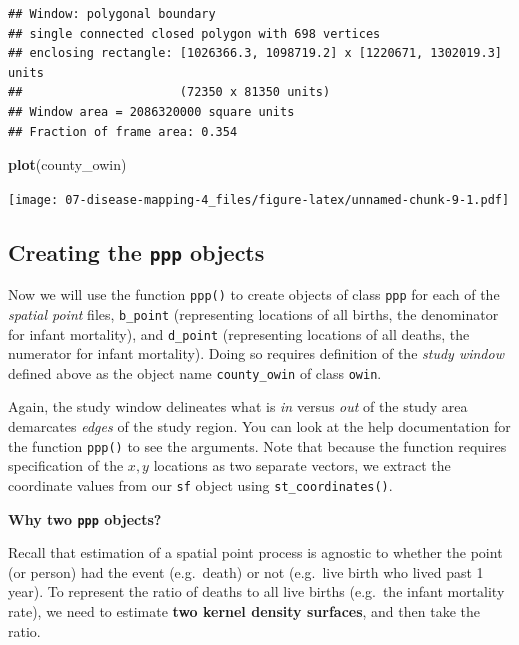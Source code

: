 \documentclass[
]{book}
\newenvironment{Shaded}{\begin{snugshade}}{\end{snugshade}}
\newcommand{\FunctionTok}[1]{\textcolor[rgb]{0.13,0.29,0.53}{\textbf{#1}}}
\newcommand{\NormalTok}[1]{#1}
\newenvironment{rmdnote}[1]
  {
  \begin{itemize}
  \renewcommand{\labelitemi}{
    \raisebox{-.7\height}[0pt][0pt]{
      {\setkeys{Gin}{width=3em,keepaspectratio}\texttt{[image: images/\#1]}}
    }
  }
  \setlength{\fboxsep}{1em}
  \begin{note}
  \item
  }
  {
  \end{note}
  \end{itemize}
  }
\begin{document}
\begin{verbatim}
## Window: polygonal boundary
## single connected closed polygon with 698 vertices
## enclosing rectangle: [1026366.3, 1098719.2] x [1220671, 1302019.3] units
##                      (72350 x 81350 units)
## Window area = 2086320000 square units
## Fraction of frame area: 0.354
\end{verbatim}

\begin{Shaded}
\begin{Highlighting}[]
\FunctionTok{plot}\NormalTok{(county\_owin)}
\end{Highlighting}
\end{Shaded}

\texttt{[image: 07-disease-mapping-4\_files/figure-latex/unnamed-chunk-9-1.pdf]}

\hypertarget{creating-the-ppp-objects}{%
\subsection{\texorpdfstring{Creating the \texttt{ppp} objects}{Creating the ppp objects}}\label{creating-the-ppp-objects}}

Now we will use the function \texttt{ppp()} to create objects of class \texttt{ppp} for each of the \emph{spatial point} files, \texttt{b\_point} (representing locations of all births, the denominator for infant mortality), and \texttt{d\_point} (representing locations of all deaths, the numerator for infant mortality). Doing so requires definition of the \emph{study window} defined above as the object name \texttt{county\_owin} of class \texttt{owin}.

Again, the study window delineates what is \emph{in} versus \emph{out} of the study area demarcates \emph{edges} of the study region. You can look at the help documentation for the function \texttt{ppp()} to see the arguments. Note that because the function requires specification of the \(x,y\) locations as two separate vectors, we extract the coordinate values from our \texttt{sf} object using \texttt{st\_coordinates()}.

\begin{rmdnote}{note}
\textbf{Why two \texttt{ppp} objects?}

Recall that estimation of a spatial point process is agnostic to whether the point (or person) had the event (e.g.~death) or not (e.g.~live birth who lived past 1 year). To represent the ratio of deaths to all live births (e.g.~the infant mortality rate), we need to estimate \textbf{two kernel density surfaces}, and then take the ratio.

\end{rmdnote}
\end{document}
